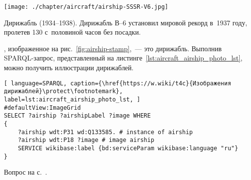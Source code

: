 %
\begin{marginfigure}[3.2cm]
\centering\texttt{[image: ./chapter/aircraft/airship-SSSR-V6.jpg]}
\caption[Дирижабль СССР--В6 <<Осоавиахим>>.]{Дирижабль  (1934--1938). 
             Дирижабль В--6 установил мировой рекорд в~1937 году, 
             пролетев 130 с~половиной часов без посадки.\\
    }%
    \label{fig:airship-stamp}%
\end{marginfigure}
% 
\begin{task}
    \label{answer:aircraft_question_airship_2}
, изображенное на рис.~\ref{fig:airship-stamp},~--- это дирижабль. 
    Выполнив SPARQL-запрос, 
    представленный на листинге~\ref{lst:aircraft_airship_photo_lst}, 
    можно получить иллюстрации дирижаблей.
    
	\begin{lstlisting}[ language=SPARQL, caption={\href{https://w.wiki/t4c}{Изображения дирижаблей}\protect\footnotemark}, label=lst:aircraft_airship_photo_lst, ]
#defaultView:ImageGrid
SELECT ?airship ?airshipLabel ?image WHERE
{
    ?airship wdt:P31 wd:Q133585. # instance of airship
  	?airship wdt:P18 ?image # image airship
    SERVICE wikibase:label {bd:serviceParam wikibase:language "ru"}
}
\end{lstlisting}
    
\small{Вопрос на с.~\pageref{fig:airship_question_aircraft}.}
\end{task}






